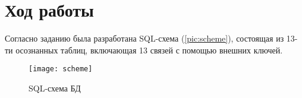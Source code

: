 \section{Ход работы}

Согласно заданию была разработана SQL-схема (\vref{pic:scheme}), состоящая из 13-ти осознанных таблиц, включающая 13 связей с помощью внешних ключей.

\begin{figure}[ht]
	\centering
	\texttt{[image: scheme]}
	\caption{SQL-схема БД}
	\label{pic:scheme}
\end{figure}